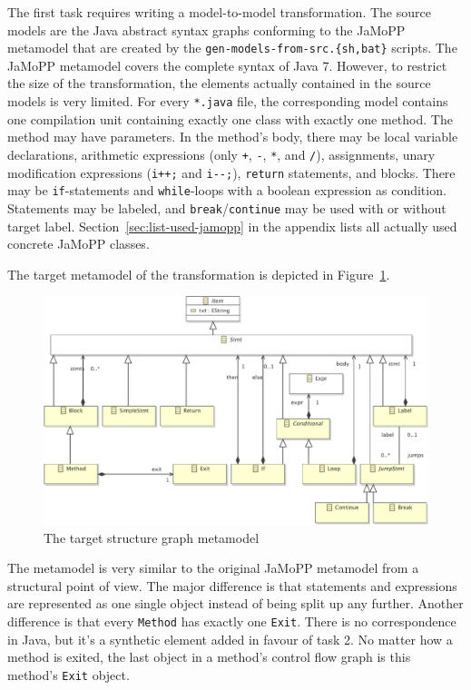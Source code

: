 \documentclass[11pt]{article}
\begin{document}
The first task requires writing a model-to-model transformation.  The source
models are the Java abstract syntax graphs conforming to the JaMoPP metamodel
that are created by the \verb$gen-models-from-src.{sh,bat}$ scripts.  The
JaMoPP metamodel covers the complete syntax of Java 7.  However, to restrict
the size of the transformation, the elements actually contained in the source
models is very limited.  For every \verb|*.java| file, the corresponding model
contains one compilation unit containing exactly one class with exactly one
method.  The method may have parameters.  In the method's body, there may be
local variable declarations, arithmetic expressions (only \verb|+|, \verb|-|,
\verb|*|, and \verb|/|), assignments, unary modification expressions
(\verb|i++;| and \verb|i--;|), \verb|return| statements, and blocks.  There may
be \verb|if|-statements and \verb|while|-loops with a boolean expression as
condition.  Statements may be labeled, and \verb|break|/\verb|continue| may be
used with or without target label.  Section~\ref{sec:list-used-jamopp} in the
appendix lists all actually used concrete JaMoPP classes.

The target metamodel of the transformation is depicted in
Figure~\ref{fig:structure-graph-mm}.

\begin{figure}[h!]
  \centering
  \includegraphics[width=\linewidth]{../metamodel/StructureGraph}
  \caption{The target structure graph metamodel}
  \label{fig:structure-graph-mm}
\end{figure}

The metamodel is very similar to the original JaMoPP metamodel from a
structural point of view.  The major difference is that statements and
expressions are represented as one single object instead of being split up any
further.  Another difference is that every \verb|Method| has exactly one
\verb|Exit|.  There is no correspondence in Java, but it's a synthetic element
added in favour of task 2.  No matter how a method is exited, the last object
in a method's control flow graph is this method's \verb|Exit| object.
\end{document}
